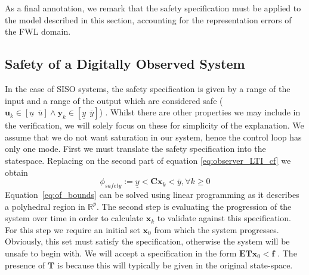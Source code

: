 \documentclass[sigconf]{llncs}
\newcommand{\mat}[1]{\boldsymbol{#1}}
\renewcommand{\vec}[1]{\boldsymbol{#1}}
\begin{document}
As a final annotation, we remark that the safety specification must be
applied to the model described in this section, accounting for the
representation errors of the FWL domain.

\subsection{Safety of a Digitally Observed System}\label{sec:cof_safety}

In the case of SISO systems, the safety specification is
given by a range of the input and a range of the output which are considered
safe ($\vec{u}_k \in [\underline{u}\ \ \overline{u}] \wedge \vec{y}_k \in
[\underline{y}\ \ \overline{y}]$)
.
Whilst there are other properties we may
include in the verification, we will solely focus on these for simplicity of
the explanation.  We assume that we do not want saturation in our
system, hence the control loop has only one mode.
First we must
translate the safety specification into the statespace.  Replacing on the
second part of equation \eqref{eq:observer_LTI_cf} we obtain
%
\begin{equation}
\phi_{safety} := \underline{y}<\mat{C}\vec{x}_k<\overline{y}, \forall k \geq 0
\label{eq:of_bounds}
\end{equation}
%
%
Equation~\eqref{eq:of_bounds} can be solved using linear programming as it
describes a polyhedral region in $\mathbb{R}^p$.  The second  step is
evaluating the progression of the system over time in order to calculate
$\vec{x}_k$ to validate against this specification.  For this step we require
an initial set $\vec{x}_0$ from which the system progresses.  Obviously, this set
must satisfy the specification, otherwise the system will be
unsafe to begin with.  We will accept a specification in the form
$\mat{E}\mat{T}\vec{x}_0<\mat{f}$ .  The presence of $\mat{T}$ is because
this will typically be given in the original state-space.
\end{document}
